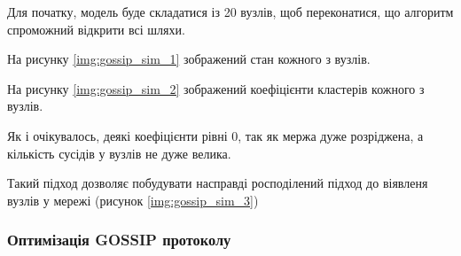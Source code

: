 \documentclass{lib/styles/default-style}
\begin{document}
    Для початку, модель буде складатися із 20 вузлів, щоб переконатися, що алгоритм спроможний відкрити всі шляхи.

    На рисунку \ref{img:gossip_sim_1} зображений стан кожного з вузлів.


    На рисунку \ref{img:gossip_sim_2} зображений коефіцієнти кластерів кожного з вузлів.


    Як і очікувалось, деякі коефіцієнти рівні 0, так як мержа дуже розріджена, а кількість сусідів у вузлів 
    не дуже велика.

    Такий підход дозволяє побудувати насправді росподілений підход до віявленя вузлів у мережі (рисунок \ref{img:gossip_sim_3})


    \subsubsection{Оптимізація GOSSIP протоколу}
\end{document}
